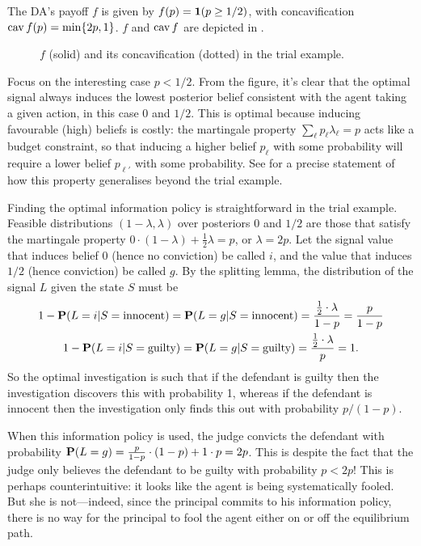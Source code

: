 \documentclass[11pt,letterpaper,reqno,oneside]{article}
\begin{document}
\begin{example}[persuasion]
	The DA's payoff $f$ is given by $f(p) = \boldsymbol{1}( p \geq 1/2 )$, with concavification $\operatorname*{cav} f(p) = \min\{ 2p, 1 \}$. $f$ and $\operatorname*{cav} f$ are depicted in .
	\begin{figure}
		\centering
		
		\caption{$f$ (solid) and its concavification (dotted) in the trial example.}
		\label{fig:KG11}
	\end{figure}
	Focus on the interesting case $p<1/2$. From the figure, it's clear that the optimal signal always induces the lowest posterior belief consistent with the agent taking a given action, in this case $0$ and $1/2$. This is optimal because inducing favourable (high) beliefs is costly: the martingale property $\sum_\ell p_\ell \lambda_\ell = p$ acts like a budget constraint, so that inducing a higher belief $p_\ell$ with some probability will require a lower belief $p_{\ell'}$ with some probability. See \textcite{KamenicaGentzkow2011} for a precise statement of how this property generalises beyond the trial example.

	Finding the optimal information policy is straightforward in the trial example. Feasible distributions $(1-\lambda,\lambda)$ over posteriors $0$ and $1/2$ are those that satisfy the martingale property $0 \cdot (1-\lambda) + \frac{1}{2} \lambda = p$, or $\lambda=2p$. Let the signal value that induces belief $0$ (hence no conviction) be called $i$, and the value that induces $1/2$ (hence conviction) be called $g$. By the splitting lemma, the distribution of the signal $L$ given the state $S$ must be
	\begin{gather*}
		1 - \mathbf{P}( L=i | S=\text{innocent} )
		= \mathbf{P}( L=g | S=\text{innocent} ) 
		= \frac{ \frac{1}{2} \cdot \lambda }{ 1-p }
		= \frac{p}{1-p}
		\\
		1 - \mathbf{P}( L=i | S=\text{guilty} ) 
		= \mathbf{P}( L=g | S=\text{guilty} ) 
		= \frac{ \frac{1}{2} \cdot \lambda }{ p } 
		= 1 .
	\end{gather*}
	So the optimal investigation is such that if the defendant is guilty then the investigation discovers this with probability 1, whereas if the defendant is innocent then the investigation only finds this out with probability $p/(1-p)$.

	When this information policy is used, the judge convicts the defendant with probability $\mathbf{P}( L=g ) = \frac{p}{1-p} \cdot (1-p) + 1 \cdot p = 2p$. This is despite the fact that the judge only believes the defendant to be guilty with probability $p<2p$! This is perhaps counterintuitive: it looks like the agent is being systematically fooled. But she is not---indeed, since the principal commits to his information policy, there is no way for the principal to fool the agent either on or off the equilibrium path.
\end{example}
\end{document}
